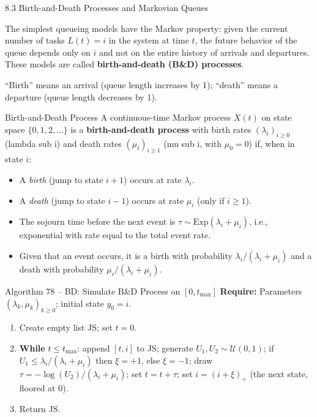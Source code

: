 \documentclass[aspectratio=169,10pt]{beamer}
\begin{document}
\begin{frame}[allowframebreaks]{8.3 Birth-and-Death Processes and Markovian Queues}

The simplest queueing models have the Markov property: given the current number
of tasks $L(t) = i$ in the system at time $t$, the future behavior of the queue
depends only on $i$ and not on the entire history of arrivals and departures.
These models are called \textbf{birth-and-death (B\&D) processes}.

``Birth'' means an arrival (queue length increases by 1); ``death'' means a
departure (queue length decreases by 1).

\begin{block}{Birth-and-Death Process}
A continuous-time Markov process $X(t)$ on state space $\{0, 1, 2, \ldots\}$
is a \textbf{birth-and-death process} with birth rates $(\lambda_i)_{i\ge 0}$
(lambda sub i) and death rates $(\mu_i)_{i\ge 1}$ (mu sub i, with $\mu_0 = 0$)
if, when in state $i$:
\begin{itemize}
  \item A \emph{birth} (jump to state $i+1$) occurs at rate $\lambda_i$.
  \item A \emph{death} (jump to state $i-1$) occurs at rate $\mu_i$
        (only if $i \ge 1$).
  \item The sojourn time before the next event is
        $\tau \sim \mathrm{Exp}(\lambda_i + \mu_i)$, i.e., exponential with
        rate equal to the total event rate.
  \item Given that an event occurs, it is a birth with probability
        $\lambda_i/(\lambda_i + \mu_i)$ and a death with probability
        $\mu_i/(\lambda_i + \mu_i)$.
\end{itemize}
\end{block}

\framebreak

\begin{block}{Algorithm 78 -- BD: Simulate B\&D Process on $[0, t_{\max}]$}
\textbf{Require:} Parameters $(\lambda_k, \mu_k)_{k\ge 0}$; initial state
$y_0 = i$.
\begin{enumerate}
  \item Create empty list JS; set $t = 0$.
  \item \textbf{While} $t \le t_{\max}$:
        append $[t, i]$ to JS;
        generate $U_1, U_2 \sim \mathcal{U}(0,1)$;
        if $U_1 \le \lambda_i/(\lambda_i+\mu_i)$ then $\xi = +1$, else $\xi = -1$;
        draw $\tau = -\log(U_2)/(\lambda_i + \mu_i)$; set $t = t + \tau$;
        set $i = (i + \xi)_+$ (the next state, floored at 0).
  \item Return JS.
\end{enumerate}
\end{block}


\end{frame}
\end{document}
